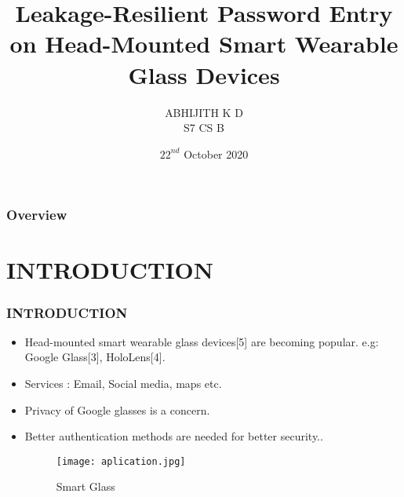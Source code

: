 \documentclass{beamer}
\title{Leakage-Resilient Password Entry on
Head-Mounted Smart Wearable Glass Devices} %
\author{ABHIJITH K D \\S7 CS B } %
\institute[College of Engineering Cherthala] %
{
\begin{small}
Guided By:\\ \vspace{0.5em}  Mrs.Anitha M A
\end{small}
\\Department of Computer Science and Engineering \\ %
\medskip
}
\date{$22^{nd}$ October 2020} %
\begin{document}
\begin{frame}
\titlepage %
\end{frame}

\begin{frame}
\frametitle{Overview} %
\tableofcontents %
\end{frame}



\section{INTRODUCTION}
\begin{frame}
\frametitle{INTRODUCTION}

\justifying

\begin{itemize}

\justifying

\item Head-mounted smart wearable glass devices[5] are becoming popular.\newline
e.g: Google Glass[3], HoloLens[4].

\item Services : Email, Social media, maps etc.

\item  Privacy of Google glasses is a concern.
\item  Better authentication methods are needed for better security..

\begin{figure}
    \begin{center}
        \texttt{[image: aplication.jpg]}
        \caption{Smart Glass}
    \end{center}
\end{figure}


\end{itemize}
\end{frame}
\end{document}
